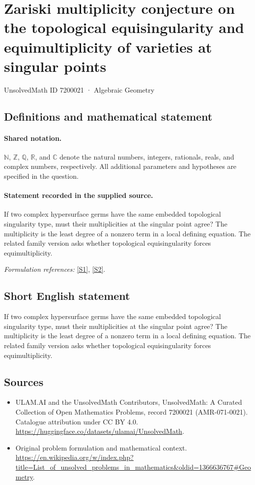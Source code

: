 \documentclass[11pt]{article}
\newcommand{\sref}[2]{\hyperlink{source:#1:#2}{[S#2]}}
\begin{document}
\setcounter{section}{7200020}
\section{Zariski multiplicity conjecture on the topological equisingularity and equimultiplicity of varieties at singular points}\label{7200021}
{\small UnsolvedMath ID 7200021 · Algebraic Geometry}
\subsection{Definitions and mathematical statement}

\paragraph{Shared notation.}$\mathbb N$, $\mathbb Z$, $\mathbb Q$, $\mathbb R$, and $\mathbb C$ denote the natural numbers, integers, rationals, reals, and complex numbers, respectively. All additional parameters and hypotheses are specified in the question.


\paragraph{Statement recorded in the supplied source.}
If two complex hypersurface germs have the same embedded topological singularity type, must their multiplicities at the singular point agree? The multiplicity is the least degree of a nonzero term in a local defining equation. The related family version asks whether topological equisingularity forces equimultiplicity.
\par\smallskip\textit{Formulation references:} \sref{7200021}{1}, \sref{7200021}{2}.
\subsection{Short English statement}
If two complex hypersurface germs have the same embedded topological singularity type, must their multiplicities at the singular point agree? The multiplicity is the least degree of a nonzero term in a local defining equation. The related family version asks whether topological equisingularity forces equimultiplicity.
\subsection{Sources}
\begin{itemize}
\item[\hypertarget{source:7200021:1}{S1}] ULAM.AI and the UnsolvedMath Contributors, UnsolvedMath: A Curated Collection of Open Mathematics Problems, record 7200021 (AMR-071-0021). Catalogue attribution under CC BY 4.0.
\url{https://huggingface.co/datasets/ulamai/UnsolvedMath}.
\item[\hypertarget{source:7200021:2}{S2}] Original problem formulation and mathematical context.
\url{https://en.wikipedia.org/w/index.php?title=List_of_unsolved_problems_in_mathematics&oldid=1366636767#Geometry}.
\end{itemize}
\label{end:7200021}
\end{document}
